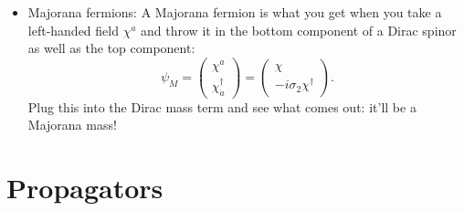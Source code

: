 \documentclass[12pt, oneside]{article}   	%
\theoremstyle{definition}
\begin{document}
\begin{itemize}
	\item Majorana fermions: A Majorana fermion is what you get when you take a left-handed field $\chi^a$ and throw it in the bottom component of a Dirac spinor as well as the top component:
	\begin{equation}
		\psi_M = \begin{pmatrix} \chi^a \\ \chi_{\dot a}^\dagger \end{pmatrix} = \begin{pmatrix} \chi \\ -i\sigma_2 \chi^\dagger \end{pmatrix}.
	\end{equation}
	Plug this into the Dirac mass term and see what comes out: it'll be a Majorana mass!
	
\end{itemize}

\section*{Propagators}
\end{document}
